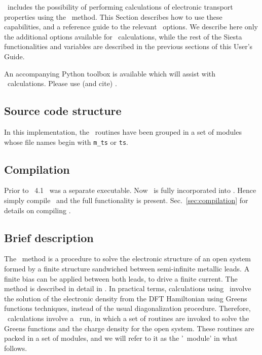 \siesta\ includes the possibility of performing calculations of
electronic transport properties using the \tsiesta\ method. This
Section describes how to use these
capabilities, and a reference guide to the relevant \fdflib\
options. We describe here only the additional options available for
\tsiesta\ calculations, while the rest of the Siesta functionalities
and variables are described in the previous sections of this User's
Guide.

An accompanying Python toolbox is available which will assist with
\tsiesta\ calculations. Please use (and cite) \sisl\cite{sisl}.


\subsection{Source code structure}

In this implementation, the \tsiesta\ routines have been grouped in a
set of modules whose file names begin with \texttt{m\_ts} or
\texttt{ts}.

\subsection{Compilation}

Prior to \siesta\ 4.1 \tsiesta\ was a separate executable. Now
\tsiesta\ is fully incorporated into \siesta. Hence simply compile
\siesta\ and the full functionality is present.
Sec.~\ref{sec:compilation} for details on compiling \siesta.

\subsection{Brief description}

The \tsiesta\ method is a procedure to solve the electronic
structure of an open system formed by a finite structure sandwiched
between semi-infinite metallic leads. A finite bias can be applied
between both leads, to drive a finite current. The method is described
in detail in \citet{Brandbyge2002,Papior2017}. In practical terms,
calculations using \tsiesta\ involve the solution of the
electronic density from the DFT Hamiltonian using Greens functions
techniques, instead of the usual diagonalization procedure. Therefore,
\tsiesta\ calculations involve a \siesta\ run, in which a
set of routines are invoked to solve the Greens functions and the
charge density for the open system. These routines are packed in a set
of modules, and we will refer to it as the '\tsiesta\ module'
in what follows.

